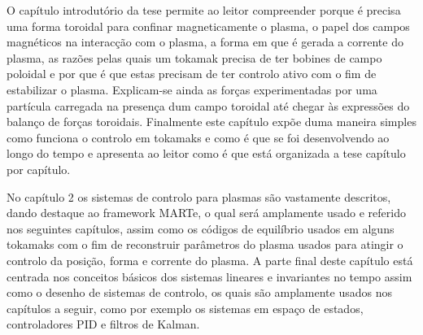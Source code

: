 O capítulo introdutório da tese permite ao leitor compreender porque é precisa uma forma toroidal para confinar magneticamente o plasma, o papel dos campos magnéticos na interacção com o plasma, a forma em que é gerada a corrente do plasma, as razões pelas quais um tokamak precisa de ter bobines de campo poloidal e por que é que estas precisam de ter controlo ativo com o fim de estabilizar o plasma. Explicam-se ainda as forças experimentadas por uma partícula carregada na presença dum campo toroidal até chegar às expressões do balanço de forças toroidais. Finalmente este capítulo expõe  duma maneira simples como funciona o controlo em tokamaks e como é que se foi desenvolvendo ao longo do tempo e apresenta ao leitor como é que está organizada a tese capítulo por capítulo. \smallskip

No capítulo 2  os sistemas de controlo para plasmas são vastamente descritos, dando destaque ao framework MARTe, o qual será amplamente usado e referido nos seguintes capítulos,  assim como  os códigos de equilíbrio usados em alguns tokamaks com o fim de reconstruir parâmetros do plasma usados para atingir o controlo da posição, forma e corrente do plasma. A parte final deste capítulo está centrada  nos conceitos básicos dos sistemas lineares e invariantes no tempo assim como o desenho de sistemas de controlo, os quais são amplamente usados nos capítulos a seguir, como por exemplo os sistemas em espaço de estados, controladores PID e filtros de Kalman. \smallskip

